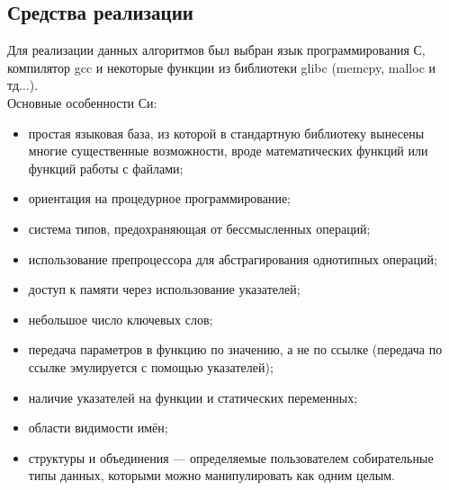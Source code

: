 \documentclass[a4paper,12pt]{article}
\begin{document}
\newpage
\subsection{Средства реализации}
Для реализации данных алгоритмов был выбран язык программирования С, компилятор gcc и некоторые функции из библиотеки glibc (memcpy, malloc и тд...). \\
Основные особенности Си:
\begin{itemize}
\item простая языковая база, из которой в стандартную библиотеку вынесены многие существенные возможности, вроде математических функций или функций работы с файлами;
\item ориентация на процедурное программирование;
\item система типов, предохраняющая от бессмысленных операций;
\item использование препроцессора для абстрагирования однотипных операций;
\item доступ к памяти через использование указателей;
\item небольшое число ключевых слов;
\item передача параметров в функцию по значению, а не по ссылке (передача по ссылке эмулируется с помощью указателей);
\item наличие указателей на функции и статических переменных;
\item области видимости имён;
\item структуры и объединения — определяемые пользователем собирательные типы данных, которыми можно манипулировать как одним целым.
\end{itemize}

\newpage
\end{document}
